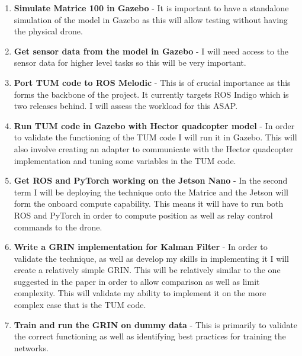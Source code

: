 \documentclass[]{../resources/final_report}
\begin{document}
\begin{enumerate}
  \item \textbf{Simulate Matrice 100 in Gazebo} - It is important to have a standalone simulation of the model in Gazebo as this will allow testing without having the physical drone.
  \item \textbf{Get sensor data from the model in Gazebo} - I will need access to the sensor data for higher level tasks so this will be very important.
  \item \textbf{Port TUM code to ROS Melodic} - This is of crucial importance as this forms the backbone of the project. It currently targets ROS Indigo which is two releases behind. I will assess the workload for this ASAP.
  \item \textbf{Run TUM code in Gazebo with Hector quadcopter model} - In order to validate the functioning of the TUM code I will run it in Gazebo. This will also involve creating an adapter to communicate with the Hector quadcopter implementation and tuning some variables in the TUM code.
  \item \textbf{Get ROS and PyTorch working on the Jetson Nano} - In the second term I will be deploying the technique onto the Matrice and the Jetson will form the onboard compute capability. This means it will have to run both ROS and PyTorch in order to compute position as well as relay control commands to the drone.
  \item \textbf{Write a GRIN implementation for Kalman Filter} - In order to validate the technique, as well as develop my skills in implementing it I will create a relatively simple GRIN. This will be relatively similar to the one suggested in the paper in order to allow comparison as well as limit complexity. This will validate my ability to implement it on the more complex case that is the TUM code.
  \item \textbf{Train and run the GRIN on dummy data} - This is primarily to validate the correct functioning as well as identifying best practices for training the networks.
\end{enumerate}
\end{document}
